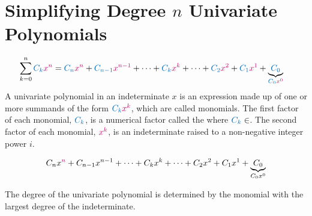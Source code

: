 \documentclass[20150903-160354-rs2.2-MarksMathNotebook.tex]{subfiles}
\begin{document}

\section{Simplifying Degree $n$ Univariate Polynomials}\label{Simplifying Degree $n$ Univariate Polynomials}

\begin{definition}
\begin{align}
\sum\limits_{k=0}^n \cBlue{C_{k}}\cRed{x^{n}} & = \cBlue{C_{n}}\cRed{x^{n}}+\cBlue{C_{n-1}}\cRed{x^{n-1}}+ \cdots + \cBlue{C_{k}}\cRed{x^{k}} + \cdots + \cBlue{C_{2}}\cRed{x^{2}}+\cBlue{C_{1}}\cRed{x^{1}}+\underbrace{\cBlue{C_{0}}}_{\cBlue{C_{0}}\cRed{x^{0}}}
\end{align}
A univariate polynomial in an indeterminate $x$ is an expression made up of one or more summands of the form $\cBlue{C_{k}}\cRed{x^{k}}$, which are called monomials.  The first factor of each monomial, $\cBlue{C_{k}}$, is a numerical factor called the  where $\cBlue{C_{k}} \in \real$. The second factor of each monomial, $\cRed{x^{k}}$, is an indeterminate raised to a non-negative integer power $i$.

\hfill \textcite{wikipedia:polynomial}
\end{definition}

\begin{definition}

\[
C_{n}x^{\cRed{n}}+C_{n-1}x^{n-1}+ \cdots + C_{k}x^{k} + \cdots + C_{2}x^{2}+C_{1}x^{1}+\underbrace{C_{0}}_{C_{0}x^{0}}
\]

The degree of the univariate polynomial is determined by the monomial with the largest degree of the indeterminate.

\end{definition}
\end{document}

